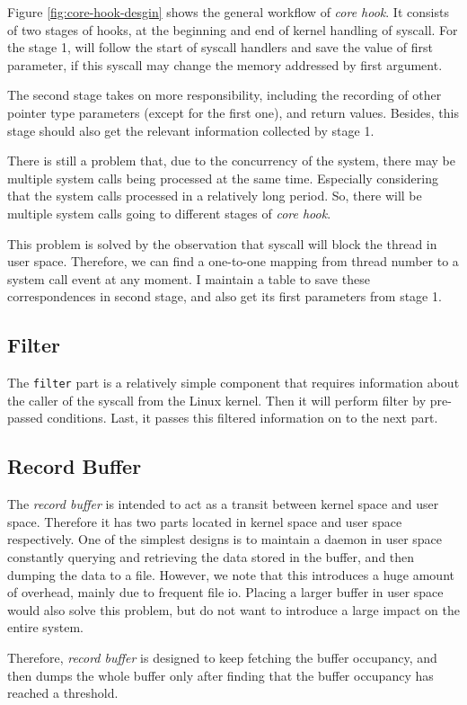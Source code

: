 Figure \ref{fig:core-hook-desgin} shows the general workflow of \textit{core hook}. It consists of two stages of hooks, at the beginning and end of kernel handling of syscall. For the stage 1, \TheName will follow the start of syscall handlers and save the value of first parameter, if this syscall may change the memory addressed by first argument.


The second stage takes on more responsibility, including the recording of other pointer type parameters (except for the first one), and return values. Besides, this stage should also get the relevant information collected by stage 1.

There is still a problem that, due to the concurrency of the system, there may be multiple system calls being processed at the same time. Especially considering that the system calls processed in a relatively long period. So, there will be multiple system calls going to different stages of  \textit{core hook}.

This problem is solved by the observation that syscall will block the thread in user space. Therefore, we can find a one-to-one mapping from thread number to a system call event at any moment. I maintain a table to save these correspondences in second stage, and also get its first parameters from stage 1.

\subsection{Filter}

The \texttt{filter} part is a relatively simple component that requires information about the caller of the syscall from the Linux kernel. Then it will perform filter by pre-passed conditions. Last, it passes this filtered information on to the next part.

\subsection{Record Buffer}

The \textit{record buffer} is intended to act as a transit between kernel space and user space. Therefore it has two parts located in kernel space and user space respectively. One of the simplest designs is to maintain a daemon in user space constantly querying and retrieving the data stored in the buffer, and then dumping the data to a file. However, we note that this introduces a huge amount of overhead, mainly due to frequent file io. Placing a larger buffer in user space would also solve this problem, but \TheName do not want to introduce a large impact on the entire system.

Therefore, \textit{record buffer} is designed to keep fetching the buffer occupancy, and then dumps the whole buffer only after finding that the buffer occupancy has reached a threshold.